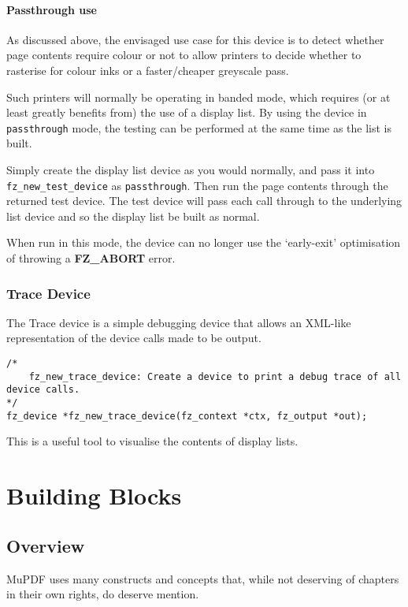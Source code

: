 \documentclass[oneside]{book}
\begin{document}
\subsubsection{Passthrough use}

As discussed above, the envisaged use case for this device is to detect whether page contents require colour or not to allow printers to decide whether to rasterise for colour inks or a faster/cheaper greyscale pass.

Such printers will normally be operating in banded mode, which requires (or at least greatly benefits from) the use of a display list. By using the device in \texttt{passthrough} mode, the testing can be performed at the same time as the list is built.

Simply create the display list device as you would normally, and pass it into \texttt{fz\_new\_test\_device} as \texttt{passthrough}. Then run the page contents through the returned test device. The test device will pass each call through to the underlying list device and so the display list be built as normal.

When run in this mode, the device can no longer use the `early-exit' optimisation of throwing a \textbf{FZ\_ABORT} error.


\subsection{Trace Device}

The Trace device is a simple debugging device that allows an XML-like representation of the device calls made to be output.

\begin{lstlisting}
/*
	fz_new_trace_device: Create a device to print a debug trace of all device calls.
*/
fz_device *fz_new_trace_device(fz_context *ctx, fz_output *out);
\end{lstlisting}

This is a useful tool to visualise the contents of display lists.

\chapter{Building Blocks}
\section{Overview}

MuPDF uses many constructs and concepts that, while not deserving of chapters in their own rights, do deserve mention.
\end{document}
